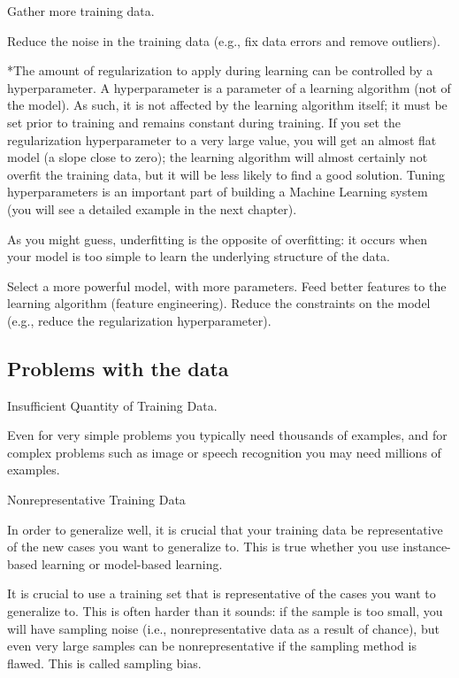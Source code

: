 \documentclass[12pt, a4paper]{article}
\begin{document}
	Gather more training data.
	
	Reduce the noise in the training data (e.g., fix data errors and remove outliers).
	
	*The amount of regularization to apply during learning can be controlled by a hyperparameter. A hyperparameter is a parameter of a learning algorithm (not of the model). As such, it is not affected by the learning algorithm itself; it must be set prior to training and remains constant during training. If you set the regularization hyperparameter to a very large value, you will get an almost flat model (a slope close to zero); the learning algorithm will almost certainly not overfit the training data, but it will be less likely to find a good solution. Tuning hyperparameters is an important part of building a Machine Learning system (you will see a detailed example in the next chapter).
	
	As you might guess, underfitting is the opposite of overfitting: it occurs when your model is too simple to learn the underlying structure of the data.
	
	Select a more powerful model, with more parameters.
	Feed better features to the learning algorithm (feature engineering).
	Reduce the constraints on the model (e.g., reduce the regularization hyperparameter).
	
	\clearpage
	
	\subsection{Problems with the data}
	
	Insufficient Quantity of Training Data.
	
	Even for very simple problems you typically need thousands of examples, and for complex problems such as image or speech recognition you may need millions of examples.
	
	Nonrepresentative Training Data
	
	In order to generalize well, it is crucial that your training data be representative of the new cases you want to generalize to. This is true whether you use instance-based learning or model-based learning.
	
	It is crucial to use a training set that is representative of the cases you want to generalize to. This is often harder than it sounds: if the sample is too small, you will have sampling noise (i.e., nonrepresentative data as a result of chance), but even very large samples can be nonrepresentative if the sampling method is flawed. This is called sampling bias.
	
\end{document}
